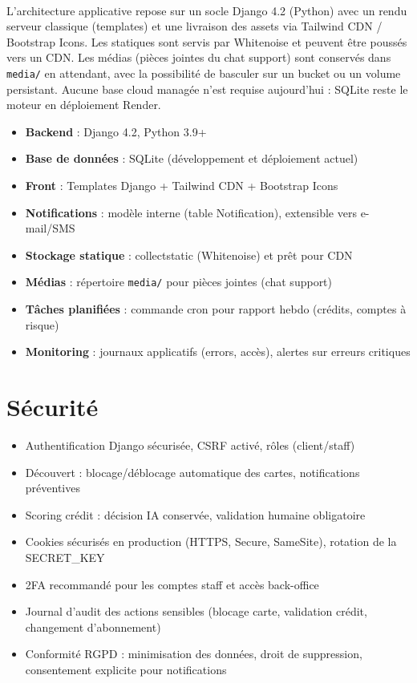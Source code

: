 \documentclass[12pt,a4paper]{report}
\begin{document}
\paragraph{}L'architecture applicative repose sur un socle Django 4.2 (Python) avec un rendu serveur classique (templates) et une livraison des assets via Tailwind CDN / Bootstrap Icons. Les statiques sont servis par Whitenoise et peuvent être poussés vers un CDN. Les médias (pièces jointes du chat support) sont conservés dans \texttt{media/} en attendant, avec la possibilité de basculer sur un bucket ou un volume persistant. Aucune base cloud managée n'est requise aujourd'hui : SQLite reste le moteur en déploiement Render.
\begin{itemize}[leftmargin=1.5cm]
    \item \textbf{Backend} : Django 4.2, Python 3.9+
    \item \textbf{Base de données} : SQLite (développement et déploiement actuel)
    \item \textbf{Front} : Templates Django + Tailwind CDN + Bootstrap Icons
    \item \textbf{Notifications} : modèle interne (table Notification), extensible vers e-mail/SMS
    \item \textbf{Stockage statique} : collectstatic (Whitenoise) et prêt pour CDN
    \item \textbf{Médias} : répertoire \texttt{media/} pour pièces jointes (chat support)
    \item \textbf{Tâches planifiées} : commande cron pour rapport hebdo (crédits, comptes à risque)
    \item \textbf{Monitoring} : journaux applicatifs (errors, accès), alertes sur erreurs critiques
\end{itemize}

\section{Sécurité}
\begin{itemize}[leftmargin=1.5cm]
    \item Authentification Django sécurisée, CSRF activé, rôles (client/staff)
    \item Découvert : blocage/déblocage automatique des cartes, notifications préventives
    \item Scoring crédit : décision IA conservée, validation humaine obligatoire
    \item Cookies sécurisés en production (HTTPS, Secure, SameSite), rotation de la SECRET\_KEY
    \item 2FA recommandé pour les comptes staff et accès back-office
    \item Journal d'audit des actions sensibles (blocage carte, validation crédit, changement d'abonnement)
    \item Conformité RGPD : minimisation des données, droit de suppression, consentement explicite pour notifications
\end{itemize}
\end{document}

